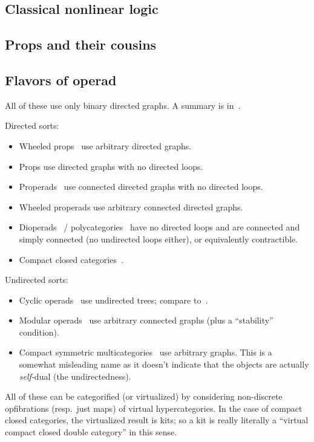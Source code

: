 \documentclass{article}
\theoremstyle{definition}
\theoremstyle{remark}
\begin{document}
\subsection{Classical nonlinear logic}
\label{sec:cl}



\subsection{Props and their cousins}
\label{sec:props}




\subsection{Flavors of operad}
\label{sec:operads}

All of these use only binary directed graphs.
A summary is in~\cite{bb:htapm}.

Directed sorts:
\begin{itemize}
\item Wheeled props~\cite{mms:wheeled-props} use arbitrary directed graphs.
\item Props use directed graphs with no directed loops.
\item Properads~\cite{vallette:properads} use connected directed graphs with no directed loops.
\item Wheeled properads use arbitrary connected directed graphs.
\item Dioperads~\cite{gan:dioperads} / polycategories~\cite{szabo:polycats,koslowski:polycats,garner:polycats} have no directed loops and are connected and simply connected (no undirected loops either), or equivalently contractible.~\cite{markl:operads-props}
\item Compact closed categories~\cite{kl:cpt}.
\end{itemize}

Undirected sorts:
\begin{itemize}
\item Cyclic operads~\cite{gk:cyclic-operads} use undirected trees; compare to~\cite{co:flang-cyclic,co:cat-cyclic}.
\item Modular operads~\cite{gk:modular-operads} use arbitrary connected graphs (plus a ``stability'' condition).
\item Compact symmetric multicategories~\cite{jk:feynman} use arbitrary graphs.
  This is a somewhat misleading name as it doesn't indicate that the objects are actually \emph{self-}dual (the undirectedness).
\end{itemize}

All of these can be categorified (or virtualized) by considering non-discrete opfibrations (resp.\ just maps) of virtual hypercategories.
In the case of compact closed categories, the virtualized result is kits; so a kit is really literally a ``virtual compact closed double category'' in this sense.




\end{document}
